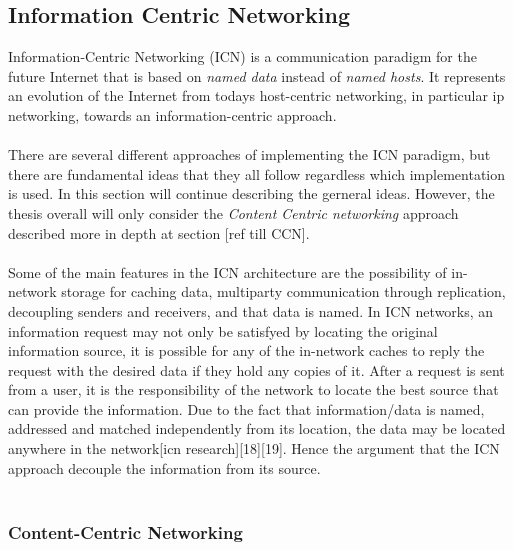 
\subsection{Information Centric Networking}
Information-Centric Networking (ICN) is a communication paradigm for the future Internet that is based on \textit{named data} instead of \textit{named hosts}. It represents an evolution of the Internet from todays host-centric networking, in particular ip networking, towards an information-centric approach.\\\\
There are several different approaches of implementing the ICN paradigm, but there are fundamental ideas that they all follow regardless which implementation is used. In this section will continue describing the gerneral ideas. However, the thesis overall will only consider the \textit{Content Centric networking} approach described more in depth at section [ref till CCN].\\\\
Some of the main features in the ICN architecture are the possibility of in-network storage for caching data, multiparty communication through replication, decoupling senders and receivers, and that data is named\cite{Ahlgren2012}. In ICN networks, an information request may not only be satisfyed by locating the original information source, it is possible for any of the in-network caches to reply the request with the desired data if they hold any copies of it. After a request is sent from a user, it is the responsibility of the network to locate the best source that can provide the information. Due to the fact that information/data is named, addressed and matched independently from its location, the data may be located anywhere in the network[icn research][18][19]. Hence the argument that the ICN approach decouple the information from its source.\\\\




\subsubsection{Content-Centric Networking}



